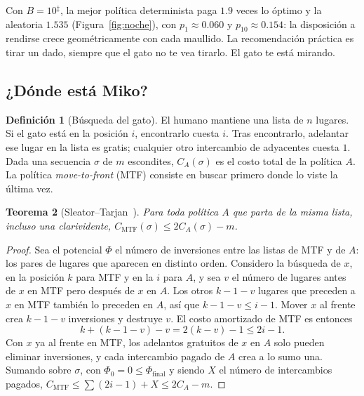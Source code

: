 \documentclass[11pt,a4paper]{article}
\theoremstyle{plain}
\newtheorem{teorema}{Teorema}[section]
\theoremstyle{definition}
\newtheorem{definicion}[teorema]{Definición}
\theoremstyle{remark}
\numberwithin{equation}{section}
\newcommand{\calib}{{\ensuremath{^{\ddagger}}}}
\begin{document}
Con $B=10$\calib, la mejor política determinista paga $1.9$ veces lo óptimo y la aleatoria $1.535$ (Figura~\ref{fig:noche}), con $p_1\approx 0.060$ y $p_{10}\approx 0.154$: la disposición a rendirse crece geométricamente con cada maullido. La recomendación práctica es tirar un dado, siempre que el gato no te vea tirarlo. El gato te está mirando.

\subsection{¿Dónde está Miko?}

\begin{definicion}[Búsqueda del gato]
El humano mantiene una lista de $n$ lugares. Si el gato está en la posición $i$, encontrarlo cuesta $i$. Tras encontrarlo, adelantar ese lugar en la lista es gratis; cualquier otro intercambio de adyacentes cuesta $1$. Dada una secuencia $\sigma$ de $m$ escondites, $C_A(\sigma)$ es el costo total de la política $A$. La política \emph{move-to-front} (MTF) consiste en buscar primero donde lo viste la última vez.
\end{definicion}

\begin{teorema}[Sleator--Tarjan~\cite{sleator}]\label{teo:mtf}
Para toda política $A$ que parta de la misma lista, incluso una clarividente, $C_{\mathrm{MTF}}(\sigma)\le 2C_A(\sigma)-m$.
\end{teorema}

\begin{proof}
Sea el potencial $\Phi$ el número de inversiones entre las listas de MTF y de $A$: los pares de lugares que aparecen en distinto orden. Considero la búsqueda de $x$, en la posición $k$ para MTF y en la $i$ para $A$, y sea $v$ el número de lugares antes de $x$ en MTF pero después de $x$ en $A$. Los otros $k-1-v$ lugares que preceden a $x$ en MTF también lo preceden en $A$, así que $k-1-v\le i-1$. Mover $x$ al frente crea $k-1-v$ inversiones y destruye $v$. El costo amortizado de MTF es entonces
\begin{equation}
  k+(k-1-v)-v=2(k-v)-1\le 2i-1.
\end{equation}
Con $x$ ya al frente en MTF, los adelantos gratuitos de $x$ en $A$ solo pueden eliminar inversiones, y cada intercambio pagado de $A$ crea a lo sumo una. Sumando sobre $\sigma$, con $\Phi_0=0\le\Phi_{\mathrm{final}}$ y siendo $X$ el número de intercambios pagados, $C_{\mathrm{MTF}}\le\sum(2i-1)+X\le 2C_A-m$.
\end{proof}
\end{document}
